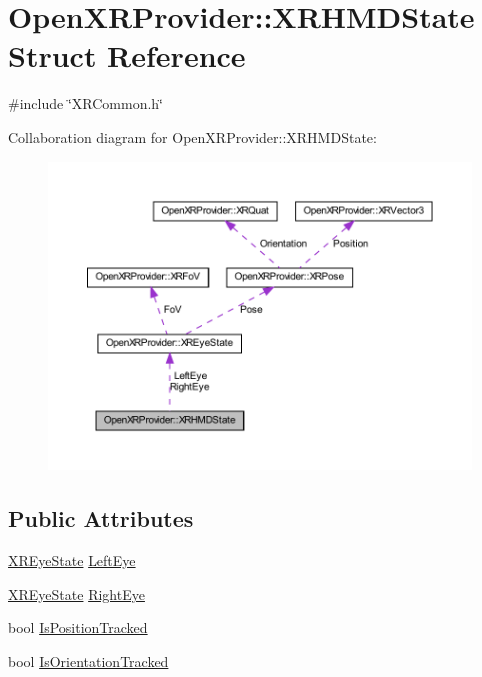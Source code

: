 \hypertarget{struct_open_x_r_provider_1_1_x_r_h_m_d_state}{}\section{Open\+X\+R\+Provider\+::X\+R\+H\+M\+D\+State Struct Reference}
\label{struct_open_x_r_provider_1_1_x_r_h_m_d_state}


{\ttfamily \#include \char`\"{}X\+R\+Common.\+h\char`\"{}}



Collaboration diagram for Open\+X\+R\+Provider\+::X\+R\+H\+M\+D\+State\+:\nopagebreak
\begin{figure}[H]
\begin{center}
\leavevmode
\includegraphics[width=350pt]{struct_open_x_r_provider_1_1_x_r_h_m_d_state__coll__graph}
\end{center}
\end{figure}
\subsection*{Public Attributes}
\begin{DoxyCompactItemize}
\item 
\mbox{\hyperlink{struct_open_x_r_provider_1_1_x_r_eye_state}{X\+R\+Eye\+State}} \mbox{\hyperlink{struct_open_x_r_provider_1_1_x_r_h_m_d_state_a601339a681e20dd9047e6d63da3a22fa}{Left\+Eye}}
\item 
\mbox{\hyperlink{struct_open_x_r_provider_1_1_x_r_eye_state}{X\+R\+Eye\+State}} \mbox{\hyperlink{struct_open_x_r_provider_1_1_x_r_h_m_d_state_a72e6afc6875efdf77079f615b0e833d3}{Right\+Eye}}
\item 
bool \mbox{\hyperlink{struct_open_x_r_provider_1_1_x_r_h_m_d_state_a46d3bdea018d488ffb535553d58594dc}{Is\+Position\+Tracked}}
\item 
bool \mbox{\hyperlink{struct_open_x_r_provider_1_1_x_r_h_m_d_state_ac03cf1cf415a74e7918aad821440040e}{Is\+Orientation\+Tracked}}
\end{DoxyCompactItemize}


